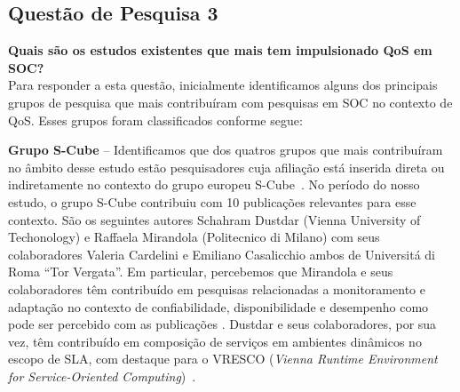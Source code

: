 \subsection{Questão de Pesquisa 3}\label{sec:QP3}

\textbf{Quais s\~{a}o os estudos existentes que mais tem impulsionado QoS em SOC?}
\\[0.01in]


Para responder a esta quest\~{a}o, inicialmente identificamos alguns dos principais grupos de pesquisa que mais contribu\'{i}ram com pesquisas em SOC no contexto de QoS. Esses grupos foram classificados conforme segue: 

\textbf{Grupo S-Cube} -- Identificamos que dos quatros grupos que mais contribu\'{i}ram no \^{a}mbito desse estudo est\~{a}o pesquisadores cuja afilia\c{c}\~{a}o est\'{a} inserida direta ou indiretamente no contexto do grupo europeu S-Cube~\cite{SCube-FINALREPORT}. No per\'{i}odo do nosso estudo, o grupo S-Cube contribuiu com 10 publica\c{c}\~{o}es relevantes para esse contexto. S\~{a}o os seguintes autores Schahram Dustdar (Vienna University of Techonology) e Raffaela Mirandola (Politecnico di Milano) com seus colaboradores Valeria Cardelini e Emiliano Casalicchio ambos de Universit\'{a} di Roma ``Tor Vergata''. Em particular, percebemos que Mirandola e seus colaboradores t\^{e}m contribu\'{i}do em pesquisas relacionadas a monitoramento e adapta\c{c}\~{a}o no contexto de confiabilidade, disponibilidade e desempenho como pode ser percebido com as publica\c{c}\~{o}es \cite{Cardellini:2009:QRA:1595696.1595718, Calinescu:2011:DQM:1990772.1991012, Ardagna:2010:POS:1814581.1814611, 10.1109/TSE.2011.68, Cardellini:2009:TSD:1692867.1692870}. Dustdar e seus colaboradores, por sua vez, t\^{e}m contribu\'{i}do em composi\c{c}\~{a}o de servi\c{c}os em ambientes din\^{a}micos no escopo de SLA, com destaque para o  VRESCO (\emph{Vienna Runtime Environment for Service-Oriented Computing})~\cite{5467022}. 

